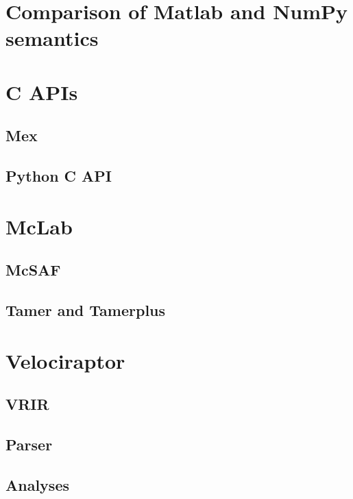 \section{Comparison of Matlab and NumPy semantics}
\section{C APIs}
\subsection{Mex}
\subsection{Python C API}
\section{McLab}
\subsection{McSAF}
\subsection{Tamer and Tamerplus}
\section{Velociraptor}
\subsection{VRIR}
\subsection{Parser}
\subsection{Analyses}

